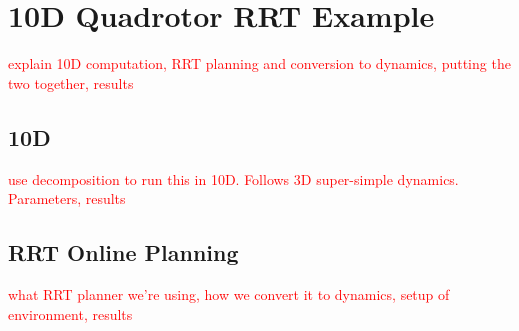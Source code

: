 \section{10D Quadrotor RRT Example \label{sec:results}}
\textcolor{red}{explain 10D computation, RRT planning and conversion to dynamics, putting the two together, results}
\subsection{10D}
\textcolor{red}{use decomposition to run this in 10D. Follows 3D super-simple dynamics. Parameters, results}
\subsection{RRT Online Planning}
\textcolor{red}{what RRT planner we're using, how we convert it to dynamics, setup of environment, results}